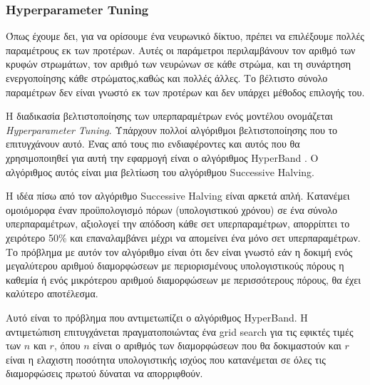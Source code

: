 \subsubsection{\textlatin{Hyperparameter Tuning}}

Όπως έχουμε δει, για να ορίσουμε ένα νευρωνικό δίκτυο, πρέπει να επιλέξουμε πολλές παραμέτρους εκ των προτέρων. Αυτές οι παράμετροι περιλαμβάνουν τον αριθμό των κρυφών στρωμάτων, τον αριθμό των νευρώνων σε κάθε στρώμα, και τη συνάρτηση ενεργοποίησης κάθε στρώματος,καθώς και πολλές άλλες. Το βέλτιστο σύνολο παραμέτρων δεν είναι γνωστό εκ των προτέρων και δεν υπάρχει μέθοδος επιλογής του.

Η διαδικασία βελτιστοποίησης των υπερπαραμέτρων ενός μοντέλου ονομάζεται \emph{\textlatin{Hyperparameter Tuning}}. Υπάρχουν πολλοί αλγόριθμοι βελτιστοποίησης που το επιτυγχάνουν αυτό. Ένας από τους πιο ενδιαφέροντες και αυτός που θα χρησιμοποιηθεί για αυτή την εφαρμογή είναι ο αλγόριθμος \textlatin{HyperBand} \cite{li2018hyperbandnovelbanditbasedapproach}. Ο αλγόριθμος αυτός είναι μια βελτίωση του αλγόριθμου \textlatin{Successive Halving}.

Η ιδέα πίσω από τον αλγόριθμο \textlatin{Successive Halving} είναι αρκετά απλή. Κατανέμει ομοιόμορφα έναν προϋπολογισμό πόρων (υπολογιστικού χρόνου) σε ένα σύνολο υπερπαραμέτρων, αξιολογεί την απόδοση κάθε σετ υπερπαραμέτρων, απορρίπτει το χειρότερο 50\% και επαναλαμβάνει μέχρι να απομείνει ένα μόνο σετ υπερπαραμέτρων. Το πρόβλημα με αυτόν τον αλγόριθμο είναι ότι δεν είναι γνωστό εάν η δοκιμή ενός μεγαλύτερου αριθμού διαμορφώσεων με περιορισμένους υπολογιστικούς πόρους η καθεμία ή ενός μικρότερου αριθμού διαμορφώσεων με περισσότερους πόρους, θα έχει καλύτερο αποτέλεσμα.

Αυτό είναι το πρόβλημα που αντιμετωπίζει ο αλγόριθμος \textlatin{HyperBand}. Η αντιμετώπιση επιτυγχάνεται πραγματοποιώντας ένα \textlatin{grid search} για τις εφικτές τιμές των $n$ και $r$, όπου $n$ είναι ο αριθμός των διαμορφώσεων που θα δοκιμαστούν και $r$ είναι η ελαχιστη ποσότητα υπολογιστικής ισχύος που κατανέμεται σε όλες τις διαμορφώσεις πρωτού δύναται να απορριφθούν.

